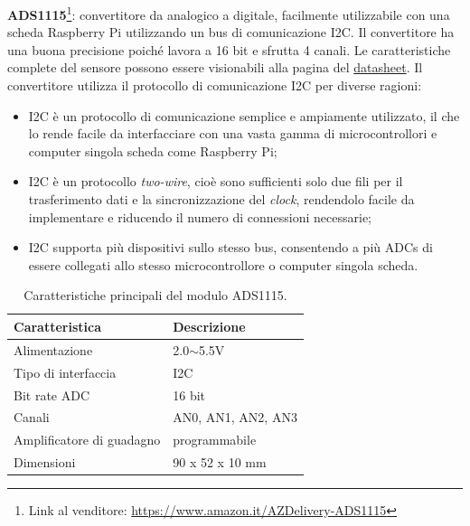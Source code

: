 \textbf{ADS1115}\footnote{Link al venditore: \href{shorturl.at/btJVZ}{https://www.amazon.it/AZDelivery-ADS1115}}: convertitore da analogico a digitale, facilmente utilizzabile con una scheda Raspberry Pi utilizzando un bus di comunicazione I2C. Il convertitore ha una buona precisione poiché lavora a 16 bit e sfrutta 4 canali. Le caratteristiche complete del sensore possono essere visionabili alla pagina del \href{https://cdn-shop.adafruit.com/datasheets/ads1115.pdf}{datasheet}. 
Il convertitore utilizza il protocollo di comunicazione I2C per diverse ragioni:
\begin{itemize}
    \item I2C è un protocollo di comunicazione semplice e ampiamente utilizzato, il che lo rende facile da interfacciare con una vasta gamma di microcontrollori e computer singola scheda come Raspberry Pi;
    \item I2C è un protocollo \textit{two-wire}, cioè sono sufficienti solo due fili per il trasferimento dati e la sincronizzazione del \textit{clock}, rendendolo facile da implementare e riducendo il numero di connessioni necessarie;
    \item I2C supporta più dispositivi sullo stesso bus, consentendo a più ADCs di essere collegati allo stesso microcontrollore o computer singola scheda.
\end{itemize}
    
\begin{table}[H]
    \centering
    \begin{tabular}{|l|l|}
    \hline
    \textbf{Caratteristica}   & \textbf{Descrizione} \\ \hline
    Alimentazione             & 2.0$\sim$5.5V        \\ \hline
    Tipo di interfaccia       & I2C                  \\ \hline
    Bit rate ADC              & 16 bit               \\ \hline
    Canali                    & AN0, AN1, AN2, AN3   \\ \hline
    Amplificatore di guadagno & programmabile        \\ \hline
    Dimensioni                & 90 x 52 x 10 mm      \\ \hline
    \end{tabular}
    \caption{\label{ADS1115-features}Caratteristiche principali del modulo ADS1115.}
\end{table}

